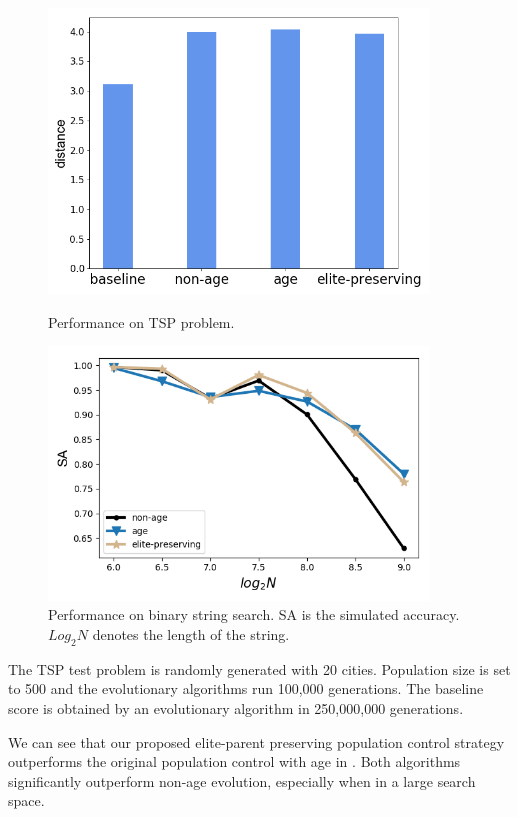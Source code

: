 \documentclass{article}
\begin{document}
\begin{normalsize}
 \begin{figure}[H]
   \centering
   \begin{minipage}[t]{0.48\linewidth}
     \centering
     \includegraphics[width = 0.9\textwidth]{figures/tsp.png}
     \caption{Performance on TSP problem.}
   \end{minipage}
   \hfill
   \begin{minipage}[t]{0.48\linewidth}
     \centering
     \includegraphics[width = 0.9\textwidth]{figures/01string.png}
     \caption{Performance on binary string search. SA is the simulated accuracy. $Log_2N$ denotes the length of the string.}
   \end{minipage}
 \end{figure}
\end{normalsize}

The TSP test problem is randomly generated with 20 cities. Population size is set to 500 and the evolutionary algorithms run 100,000 generations. The baseline score is obtained by an evolutionary algorithm in 250,000,000 generations.

We can see that our proposed elite-parent preserving population control strategy outperforms the original population control with age in \cite{zhu2019eena}. Both algorithms significantly outperform non-age evolution, especially when in a large search space.




% 

\end{document}
